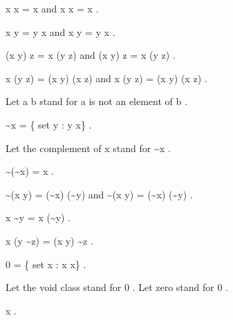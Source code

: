 \documentclass[a4paper,draft]{amsproc}
\begin{document}
\begin{forthel}
\begin{theorem}
 x \cup x = x  and  x \cap x = x .
\end{theorem}

\begin{theorem}
 x \cup y = y \cup x  and  x \cap y = y \cap x .
\end{theorem}

\begin{theorem}
 (x \cup y) \cup z = x \cup (y \cup z)  
and  (x \cap y) \cap z = x \cap (y \cap z) .
\end{theorem}

\begin{theorem}
 x \cap (y \cup z) = (x \cap y) \cup (x \cap z) 
and  x \cup (y \cap z) = (x \cup y) \cap (x \cup z) .
\end{theorem}

Let  a \notin b  stand for  a  is not an element of  b .

\begin{definition}  \sim x = \{ set  y : y \notin x\} .\end{definition}
Let the complement of  x  stand for  \sim x .

\begin{theorem}
 \sim (\sim x) = x .
\end{theorem}

\begin{theorem}
 \sim (x \cup y) = (\sim x) \cap (\sim y)  
and  \sim (x \cap y) = (\sim x) \cup (\sim y) .
\end{theorem}

\begin{definition}  x \sim y = x \cap (\sim y) .\end{definition}

\begin{theorem}
 x \cap (y \sim z) = (x \cap y) \sim z .
\end{theorem}

\begin{definition}  0 = \{ set  x : x \neq x\} .\end{definition}
Let the void class stand for  0 .
Let zero stand for  0 .

\begin{theorem}
 x  .
\end{theorem}


\end{forthel}
\end{document}
